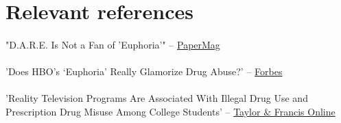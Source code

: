\documentclass[answers]{exam}
\begin{document}
\newpage
\section{Relevant references}
\paragraph{}
\paragraph{}
"D.A.R.E. Is Not a Fan of 'Euphoria'" -- \href{https://www.papermag.com/euphoria-hbo-dare-2656482879.html?rebelltitem=1#rebelltitem1}{PaperMag}
\paragraph{}
\paragraph{}
'Does HBO’s ‘Euphoria’ Really Glamorize Drug Abuse?' -- \href{https://www.forbes.com/sites/danidiplacido/2022/01/29/does-hbos-euphoria-really-glamorize-drug-abuse/?sh=55e3c6d362a9}{Forbes}
\paragraph{}
\paragraph{}
'Reality Television Programs Are Associated With Illegal Drug Use and Prescription Drug Misuse Among College Students' -- \href{https://www.tandfonline.com/doi/abs/10.3109/10826084.2015.1082593}{Taylor \& Francis Online}
\end{document}
